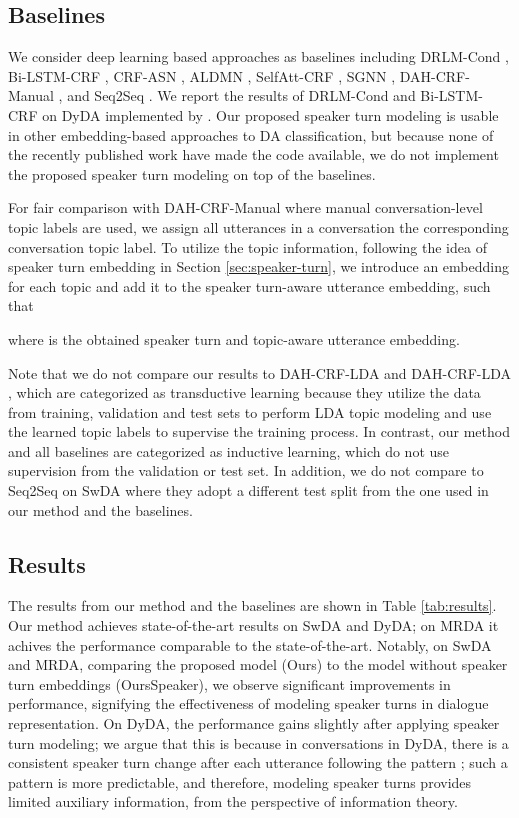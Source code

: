 \documentclass[11pt]{article}
\begin{document}
\subsection{Baselines}
We consider deep learning based approaches as baselines including DRLM-Cond \cite{ji2016latent}, Bi-LSTM-CRF \cite{kumar2018dialogue}, CRF-ASN \cite{chen2018dialogue}, ALDMN \cite{wan2018improved}, SelfAtt-CRF \cite{raheja2019dialogue}, SGNN \cite{ravi2018self}, DAH-CRF-Manual \cite{li2018dual}, and Seq2Seq \cite{colombo2020guiding}. We report the results of DRLM-Cond and Bi-LSTM-CRF on DyDA implemented by \cite{li2018dual}. Our proposed speaker turn modeling is usable in other embedding-based approaches to DA classification, but because none of the recently published work have made the code available, we do not implement the proposed speaker turn modeling on top of the baselines.

For fair comparison with DAH-CRF-Manual \cite{li2018dual} where manual conversation-level topic labels are used, we assign all utterances in a conversation the corresponding conversation topic label.
To utilize the topic information, following the idea of speaker turn embedding in Section \ref{sec:speaker-turn}, we introduce an embedding  for each topic  and add it to the speaker turn-aware utterance embedding, such that

where  is the obtained speaker turn and topic-aware utterance embedding.

Note that we do not compare our results to DAH-CRF-LDA and DAH-CRF-LDA \cite{li2018dual}, which are categorized as transductive learning because they utilize the data from training, validation and test sets to perform LDA topic modeling and use the learned topic labels to supervise the training process. In contrast, our method and all baselines are categorized as inductive learning, which do not use supervision from the validation or test set. In addition, we do not compare to Seq2Seq \cite{colombo2020guiding} on SwDA where they adopt a different test split from the one used in our method and the baselines.

\subsection{Results}
The results from our method and the baselines are shown in Table \ref{tab:results}. Our method achieves state-of-the-art results on SwDA and DyDA; on MRDA it achives the performance comparable to the state-of-the-art.
Notably, on SwDA and MRDA, comparing the proposed model (Ours) to the model without speaker turn embeddings (OursSpeaker),
we observe significant improvements in performance, signifying the effectiveness of modeling speaker turns in dialogue representation. 
On DyDA, the performance gains slightly after applying speaker turn modeling; we argue that this is because in conversations in DyDA, there is a consistent speaker turn change after each utterance following the pattern ; such a pattern is more predictable, and therefore, modeling speaker turns provides limited auxiliary information, from the perspective of information theory.
\end{document}
